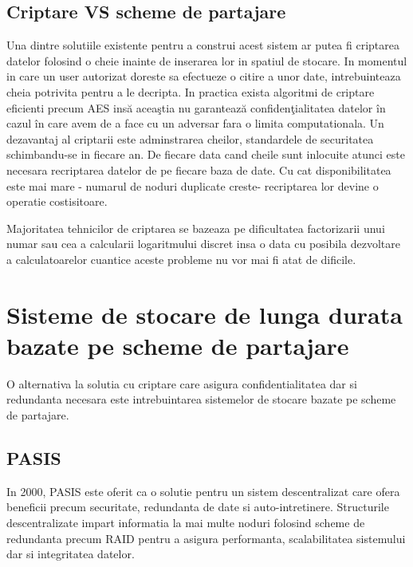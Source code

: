 \documentclass{llncs}
\begin{document}
\subsection{Criptare VS scheme de partajare}


Una dintre solutiile existente pentru a construi acest sistem ar putea fi criptarea datelor folosind o cheie inainte de inserarea lor in spatiul de stocare. In momentul in care un user autorizat doreste sa efectueze o citire a unor date, intrebuinteaza cheia potrivita pentru a le decripta.
In practica exista algoritmi de criptare eficienti precum AES ins\u{a} acea\c{s}tia nu garanteaz\u{a} confiden\c{t}ialitatea datelor \^{i}n cazul \^{i}n care avem de a face cu un adversar fara o limita computationala. Un dezavantaj al criptarii este adminstrarea cheilor, standardele de securitatea schimbandu-se in fiecare an.
De fiecare data cand cheile sunt inlocuite atunci este necesara recriptarea datelor de pe fiecare baza de date. Cu cat disponibilitatea este mai mare - numarul de noduri duplicate creste- recriptarea lor devine o operatie costisitoare. 

Majoritatea tehnicilor de criptarea se bazeaza pe dificultatea factorizarii unui numar sau cea a calcularii logaritmului discret insa o data cu posibila dezvoltare a calculatoarelor cuantice aceste probleme nu vor mai fi atat de dificile. \cite{Shor:1994}

\section{Sisteme de stocare de lunga durata bazate pe scheme de partajare}

O alternativa la solutia cu criptare care asigura confidentialitatea dar si redundanta necesara este intrebuintarea sistemelor de stocare bazate pe scheme de partajare. \cite{W:2000,SB:2005,SGMV:2009}


\subsection{PASIS}
\label{sec:desc_pasis}
In 2000, PASIS este oferit ca o solutie pentru un sistem descentralizat care ofera beneficii precum securitate, redundanta de date si auto-intretinere.
Structurile descentralizate impart informatia la mai multe noduri folosind scheme de redundanta precum RAID pentru a asigura performanta, scalabilitatea sistemului dar si integritatea datelor. \cite{Patterson:1988}
\end{document}
